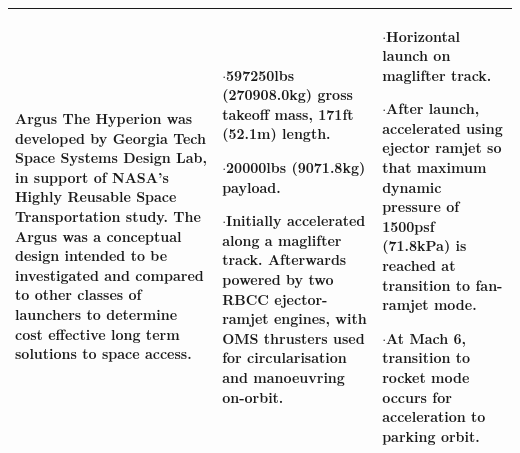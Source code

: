 \begin{xltabular}{\linewidth}{|X|X|X|}
\\
\hline \small\textbf{Argus}\cite{Argus} \newline\newline
The Hyperion was developed by Georgia Tech Space Systems Design Lab, in support of NASA's Highly Reusable Space Transportation study. The Argus was a conceptual design intended to be investigated and compared to other classes of launchers to determine cost effective long term solutions to space access.  
&\small
{}

$\cdot$597250lbs (270908.0kg) gross takeoff mass, 171ft (52.1m) length. 

$\cdot$20000lbs (9071.8kg) payload.

$\cdot$Initially accelerated along a maglifter track. Afterwards powered by two RBCC ejector-ramjet engines, with OMS thrusters used for circularisation and manoeuvring on-orbit. 

&\small
$\cdot$Horizontal launch on maglifter track. 

$\cdot$After launch, accelerated using ejector ramjet so that maximum dynamic pressure of 1500psf (71.8kPa) is reached at transition to fan-ramjet mode. 

$\cdot$At Mach 6, transition to rocket mode occurs for acceleration to parking orbit.\\ 

\hline 
\end{xltabular} 


